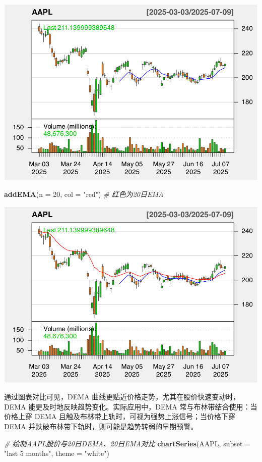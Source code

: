 \documentclass[]{ctexbook}
\newenvironment{Shaded}{\begin{snugshade}}{\end{snugshade}}
\newcommand{\AttributeTok}[1]{\textcolor[rgb]{0.13,0.29,0.53}{#1}}
\newcommand{\CommentTok}[1]{\textcolor[rgb]{0.56,0.35,0.01}{\textit{#1}}}
\newcommand{\DecValTok}[1]{\textcolor[rgb]{0.00,0.00,0.81}{#1}}
\newcommand{\FunctionTok}[1]{\textcolor[rgb]{0.13,0.29,0.53}{\textbf{#1}}}
\newcommand{\NormalTok}[1]{#1}
\newcommand{\StringTok}[1]{\textcolor[rgb]{0.31,0.60,0.02}{#1}}
\begin{document}
\includegraphics[width=0.9\linewidth]{quantmod_files/figure-latex/dema-2}

\begin{Shaded}
\begin{Highlighting}[]
\FunctionTok{addEMA}\NormalTok{(}\AttributeTok{n =} \DecValTok{20}\NormalTok{, }\AttributeTok{col =} \StringTok{"red"}\NormalTok{)      }\CommentTok{\# 红色为20日EMA}
\end{Highlighting}
\end{Shaded}

\includegraphics[width=0.9\linewidth]{quantmod_files/figure-latex/dema-3}

通过图表对比可见，DEMA 曲线更贴近价格走势，尤其在股价快速变动时，DEMA 能更及时地反映趋势变化。实际应用中，DEMA 常与布林带结合使用：当价格上穿 DEMA 且触及布林带上轨时，可视为强势上涨信号；当价格下穿 DEMA 并跌破布林带下轨时，则可能是趋势转弱的早期预警。

\begin{Shaded}
\begin{Highlighting}[]
\CommentTok{\# 绘制AAPL股价与20日DEMA、20日EMA对比}
\FunctionTok{chartSeries}\NormalTok{(AAPL, }\AttributeTok{subset =} \StringTok{"last 5 months"}\NormalTok{, }\AttributeTok{theme =} \StringTok{"white"}\NormalTok{)}
\end{Highlighting}
\end{Shaded}
\end{document}
